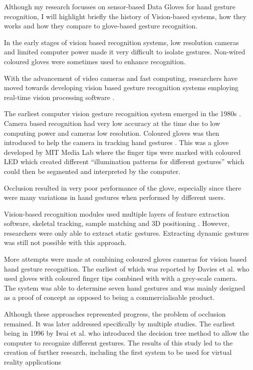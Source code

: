 Although my research focusses on sensor-based Data Gloves for hand gesture recognition, I will highlight briefly the history of Vision-based systems, how they works and how they compare to glove-based gesture recognition.

In the early stages of vision based recognition systems, low resolution cameras and limited computer power made it very difficult to isolate gestures. Non-wired coloured gloves were sometimes used to enhance recognition.

With the advancement of video cameras and fast computing, researchers have moved towards developing vision based gesture recognition systems employing real-time vision processing software \parencite{Pavlovic1997}.

The earliest computer vision gesture recognition system emerged in the 1980s \parencite{Premaratne2010}. Camera based recognition had very low accuracy at the time due to low computing power and cameras low resolution. Coloured gloves was then introduced to help the camera in tracking hand gestures \parencite{James1994}. This was a glove developed by MIT Media Lab where the finger tips were marked with coloured LED which created different ``illumination patterns for different gestures'' \parencite{Sturman1994} which could then be segmented and interpreted by the computer.

Occlusion resulted in very poor performance of the glove, especially since there were many variations in hand gestures when performed by different users.

Vision-based recognition modules used multiple layers of feature extraction software, skeletal tracking, sample matching and 3D positioning \parencite{Berci2007}. However, researchers were only able to extract static gestures. Extracting dynamic gestures was still not possible with this approach.

More attempts were made at combining coloured gloves cameras for vision based hand gesture recognition. The earliest of which was reported by Davies et al. \parencite{James1994} who used gloves with coloured finger tips combined with with a grey-scale camera. The system was able to determine seven hand gestures and was mainly designed as a proof of concept as opposed to being a commercialisable product.

Although these approaches represented progress, the problem of occlusion remained. It was later addressed specifically by multiple studies. The earliest being in 1996 by Iwai et al. \parencite{Iwai1996} who introduced the decision tree method to allow the computer to recognize different gestures. The results of this study led to the creation of further research, including the first system to be used for virtual reality applications \parencite{Wang2009}

